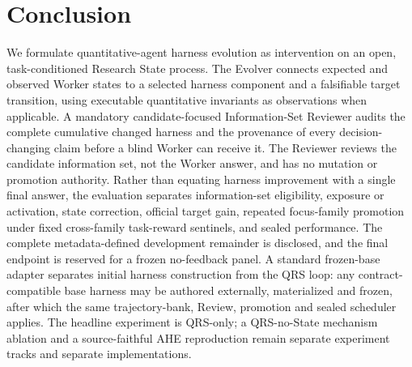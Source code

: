 \section{Conclusion}

We formulate quantitative-agent harness evolution as intervention on an open,
task-conditioned Research State process. The Evolver connects expected and
observed Worker states to a selected harness component and a falsifiable target
transition, using executable quantitative invariants as observations when
applicable. A mandatory candidate-focused Information-Set Reviewer audits the
complete cumulative changed harness and the provenance of every
decision-changing claim before a blind Worker can receive it. The Reviewer
reviews the candidate information set, not the Worker answer, and has no
mutation or promotion authority. Rather than equating harness improvement
with a single final answer, the evaluation separates information-set
eligibility, exposure or activation, state correction, official target gain,
repeated focus-family promotion under fixed cross-family task-reward sentinels,
and sealed performance. The complete metadata-defined development remainder is
disclosed, and the final endpoint is reserved for a frozen no-feedback panel. A
standard frozen-base adapter separates
initial harness construction from the QRS loop: any contract-compatible base
harness may be authored externally, materialized and frozen, after which the
same trajectory-bank, Review, promotion and sealed scheduler applies. The
headline experiment is QRS-only; a
QRS-no-State mechanism ablation and a source-faithful AHE reproduction remain
separate experiment tracks and separate implementations. 
